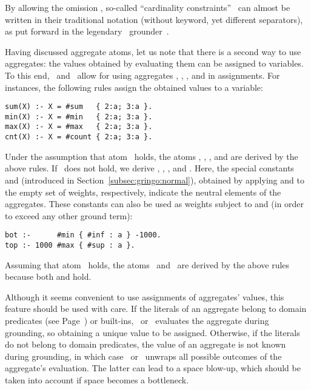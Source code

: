\begin{note}
By allowing the omission ,
so-called ``cardinality constraints''~\cite{siniso02a}
can almost be written in their traditional notation (without keyword, yet different separators),
as put forward in the legendary \lparse\ grounder~\cite{lparseManual}.  
\eexample
\end{note}

Having discussed aggregate atoms,
let us note that there is a second way to use aggregates:
the values obtained by evaluating them can be assigned to variables.
To this end, \gringo\ and \clingo\ allow for using aggregates
, , , and  in assignments.
%
%
For instances, the following rules assign the obtained values to a variable:
\begin{lstlisting}[numbers=none]
sum(X) :- X = #sum   { 2:a; 3:a }.
min(X) :- X = #min   { 2:a; 3:a }.
max(X) :- X = #max   { 2:a; 3:a }.
cnt(X) :- X = #count { 2:a; 3:a }.
\end{lstlisting}
Under the assumption that atom~ holds,
the atoms , ,
, and  are
derived by the above rules.
If~ does not hold, we derive 
, ,
, and .
%
Here, the special constants  and 
(introduced in Section~\ref{subsec:gringo:normal}),
obtained by applying  and  to the empty set of weights, respectively,
indicate the neutral elements of the aggregates.
%
These constants can also be used as weights subject to 
 and  (in order to exceed any other ground term):
\begin{lstlisting}[numbers=none]
bot :-      #min { #inf : a } -1000.
top :- 1000 #max { #sup : a }.
\end{lstlisting}
Assuming that atom~ holds,
the atoms~ and~ are derived by the above rules
because both  and  hold.

Although it seems convenient to use assignments of aggregates' values,
this feature should be used with care.
If the literals of an aggregate belong to domain predicates
(see Page~\pageref{pg:domain}) or built-ins,
\gringo\ or \clingo\ evaluates the aggregate during grounding, so obtaining
a unique value to be assigned.
%
%
Otherwise, if the literals do not belong to domain predicates,
the value of an aggregate is not known during grounding,
in which case \gringo\ or \clingo\ unwraps all possible outcomes of the
aggregate's evaluation.
The latter can lead to a space blow-up, which should be taken into account
if space becomes a bottleneck.

